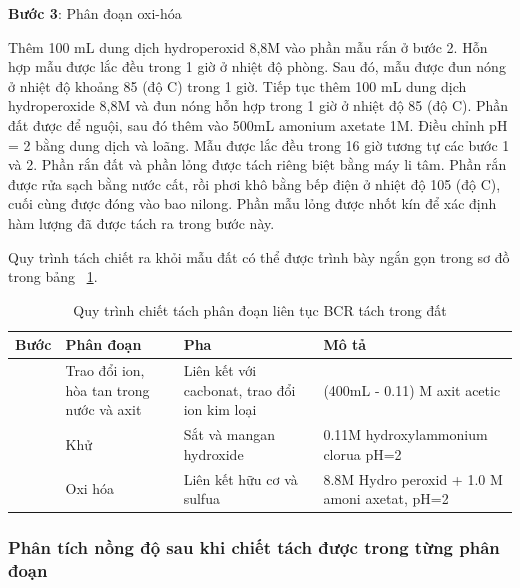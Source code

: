                 
        \textbf{Bước 3}: Phân đoạn oxi-hóa
        
        Thêm 100 mL dung dịch hydroperoxid 8,8M vào phần mẫu rắn ở bước 2. Hỗn hợp mẫu được lắc đều trong 1 giờ ở nhiệt độ phòng. Sau đó, mẫu được đun nóng ở nhiệt độ khoảng 85 (độ C) trong 1 giờ. Tiếp tục thêm 100 mL dung dịch hydroperoxide 8,8M và đun nóng hỗn hợp trong 1 giờ ở nhiệt độ 85 (độ C). Phần đất được để nguội, sau đó thêm vào 500mL amonium axetate 1M. Điều chỉnh pH = 2 bằng dung dịch  và  loãng. Mẫu được lắc đều trong 16 giờ tương tự các bước 1 và 2. Phần rắn đất và phần lỏng được tách riêng biệt bằng máy li tâm. Phần rắn được rửa sạch bằng nước cất, rồi phơi khô bằng bếp điện ở nhiệt độ 105 (độ C), cuối cùng được đóng vào bao nilong. Phần mẫu lỏng được nhốt kín để xác định hàm lượng  đã được tách ra trong bước này.
 

         Quy trình tách chiết  ra khỏi mẫu đất có thể được trình bày ngắn gọn trong sơ đồ trong bảng ~\ref{table:BCRCM601}. 

    \begin{table}[ht]
        \centering
        \caption{Quy trình chiết tách phân đoạn liên tục BCR tách  trong đất} %
        \label{table:BCRCM601}
        \begin{tabularx}{\textwidth}{>{\centering\arraybackslash}p{1cm} >{\centering\arraybackslash}p{3.5cm} >{\centering\arraybackslash}p{4.0cm} >{\centering\arraybackslash}p{5.5cm}}
            \toprule
            Bước    & Phân đoạn & Pha     &      Mô tả\\
            \midrule
            1       &  Trao đổi ion, hòa tan trong nước và axit         &  Liên kết với cacbonat, trao đổi ion kim loại         &    (400mL - 0.11) M axit acetic       \\
            2       &  Khử         &  Sắt và mangan hydroxide       &  0.11M hydroxylammonium clorua pH=2      \\
            3       &  Oxi hóa     &   Liên kết hữu cơ và sulfua        &   8.8M Hydro peroxid +  1.0 M amoni axetat, pH=2     \\
            \bottomrule
        \end{tabularx}
    \end{table}


  
\subsubsection{Phân tích nồng độ  sau khi chiết tách được trong từng phân đoạn}
  
